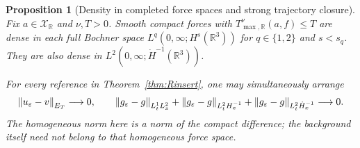 \documentclass[11pt,a4paper]{article}
\newtheorem{proposition}[theorem]{Proposition}
\theoremstyle{definition}\newtheorem{definition}[theorem]{Definition}
\theoremstyle{remark}\newtheorem{remark}[theorem]{Remark}
\newcommand{\R}{\mathbb R}\newcommand{\TT}{\mathbb T^3}
\newcommand{\norm}[1]{\left\lVert#1\right\rVert}
\begin{document}
\begin{proposition}[Density in completed force spaces and strong trajectory closure]\label{prop:Renergy}
Fix $a\in\mathcal X_{\R}$ and $\nu,T>0$. Smooth compact forces with $T^\nu_{\max,\R}(a,f)\le T$ are dense in each full Bochner space $L^q(0,\infty;H^s(\R^3))$ for $q\in\{1,2\}$ and $s<s_q$. They are also dense in $L^2(0,\infty;\dot H^{-1}(\R^3))$.

For every reference in Theorem~\ref{thm:Rinsert}, one may simultaneously arrange
\[
 \norm{u_\eps-v}_{E_T}\longrightarrow0,\qquad
 \norm{g_\eps-g}_{L^1_tL^2_x}
 +\norm{g_\eps-g}_{L^2_tH^{-1}_x}
 +\norm{g_\eps-g}_{L^2_t\dot H^{-1}_x}\longrightarrow0.
\]
The homogeneous norm here is a norm of the compact difference; the background itself need not belong to that homogeneous force space.
\end{proposition}
\end{document}
